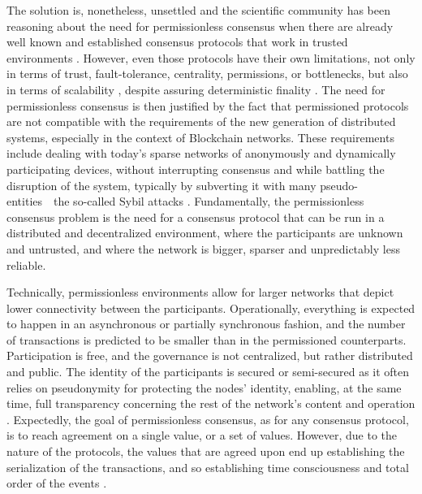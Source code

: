 The solution is, nonetheless, unsettled and the scientific community has been reasoning about the need for permissionless consensus when there are already well known and established consensus protocols that work in trusted environments \cite{castro1999practical, miller2016honey}. However, even those protocols have their own limitations, not only in terms of trust, fault-tolerance, centrality, permissions, or bottlenecks, but also in terms of scalability \cite{miller2016honey}, despite assuring deterministic finality \cite{decker2016bitcoin}. The need for permissionless consensus is then justified by the fact that permissioned protocols are not compatible with the requirements of the new generation of distributed systems, especially in the context of Blockchain networks. These requirements include dealing with today's sparse networks of anonymously and dynamically participating devices, without interrupting consensus and while battling the disruption of the system, typically by subverting it with many pseudo-entities~\textemdash~the so-called Sybil attacks \cite{8629877, survey-dist-consensus}. Fundamentally, the permissionless consensus problem is the need for a consensus protocol that can be run in a distributed and decentralized environment, where the participants are unknown and untrusted, and where the network is bigger, sparser and unpredictably less reliable.

Technically, permissionless environments allow for larger networks that depict lower connectivity between the participants. Operationally, everything is expected to happen in an asynchronous or partially synchronous fashion, and the number of transactions is predicted to be smaller than in the permissioned counterparts. Participation is free, and the governance is not centralized, but rather distributed and public. The identity of the participants is secured or semi-secured as it often relies on pseudonymity for protecting the nodes' identity, enabling, at the same time, full transparency concerning the rest of the network's content and operation \cite{xiao2019distributed}. Expectedly, the goal of permissionless consensus, as for any consensus protocol, is to reach agreement on a single value, or a set of values. However, due to the nature of the protocols, the values that are agreed upon end up establishing the serialization of the transactions, and so establishing time consciousness and total order of the events \cite{8629877}.

